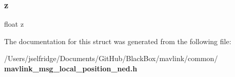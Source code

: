 \mbox{\label{struct____mavlink__local__position__ned__t_af73583b1e980b0aa03f9884812e9fd4d}} 
\subsubsection{z}
{\footnotesize\ttfamily float z}



The documentation for this struct was generated from the following file\+:\begin{DoxyCompactItemize}
\item 
/\+Users/jselfridge/\+Documents/\+Git\+Hub/\+Black\+Box/mavlink/common/\textbf{ mavlink\+\_\+msg\+\_\+local\+\_\+position\+\_\+ned.\+h}\end{DoxyCompactItemize}
